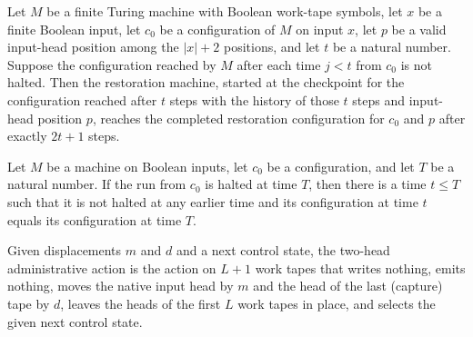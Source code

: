\begin{lemma}
\label{Complexity.enumCont_undo_run}
\leanok
{}
Let $M$ be a finite Turing machine with Boolean work-tape symbols, let $x$ be a finite
Boolean input, let $c_0$ be a configuration of $M$ on input $x$, let $p$ be a valid
input-head position among the $|x|+2$ positions, and let $t$ be a natural number.
Suppose the configuration reached by $M$ after each time $j<t$ from $c_0$ is not halted.
Then the restoration machine, started at the checkpoint for the configuration reached
after $t$ steps with the history of those $t$ steps and input-head position $p$, reaches
the completed restoration configuration for $c_0$ and $p$ after exactly $2t+1$ steps.
\end{lemma}

\begin{lemma}
\label{Complexity.enumCont_first_halt}
\leanok
{}
Let $M$ be a machine on Boolean inputs, let $c_0$ be a configuration, and let $T$ be a
natural number. If the run from $c_0$ is halted at time $T$, then there is a time $t\le
T$ such that it is not halted at any earlier time and its configuration at time $t$
equals its configuration at time $T$.
\end{lemma}

\begin{definition}
\label{Complexity.enumCont_bufferAction}
\leanok
{}
Given displacements $m$ and $d$ and a next control state, the two-head
administrative action is the action on $L + 1$ work tapes that writes nothing,
emits nothing, moves the native input head by $m$ and the head of the last
(capture) tape by $d$, leaves the heads of the first $L$ work tapes in place, and
selects the given next control state.
\end{definition}

